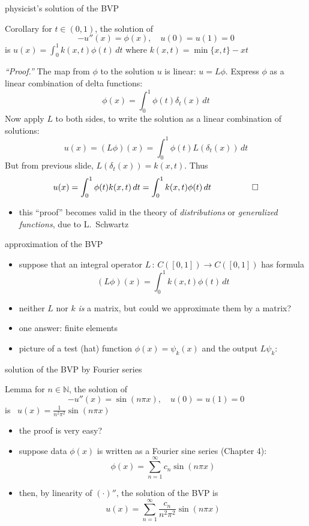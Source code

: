 \documentclass[10pt,
               svgnames,
               hyperref={colorlinks,
                         citecolor=DeepPink4,
                         linkcolor=FireBrick,
                         urlcolor=Maroon},
               usepdftitle=false]{beamer}
\newcommand{\NN}{\mathbb{N}}
\newcommand{\ds}{\displaystyle}
\begin{document}
\begin{frame}{physicist's solution of the BVP}

\begin{block}{Corollary}
for $t\in (0,1)$, the solution of
    $$-u''(x) = \phi(x), \quad u(0) = u(1) = 0$$
is $u(x) = \int_0^1 k(x,t) \phi(t)\,dt$ where $k(x,t) = \min\{x,t\} - xt$
\end{block}

{\footnotesize
\noindent \emph{``Proof.''}  The map from $\phi$ to the solution $u$ is linear: $u=L\phi$. Express $\phi$ as a linear combination of delta functions:
    $$\phi(x) = \int_0^1 \phi(t) \delta_t(x)\,dt$$
Now apply $L$ to both sides, to write the solution as a linear combination of solutions:
	$$u(x) = (L\phi)(x) = \int_0^1 \phi(t) L(\delta_t(x))\,dt$$
But from previous slide, $L(\delta_t(x))=k(x,t)$.  Thus
	$$u(x) = \int_0^1 \phi(t) k(x,t)\,dt = \int_0^1 k(x,t) \phi(t)\,dt \hspace{10mm} \qed$$

\begin{itemize}
\item this ``proof'' becomes valid in the theory of \emph{distributions} or \emph{generalized functions}, due to L.~Schwartz
\end{itemize}
}
\end{frame}


\begin{frame}{approximation of the BVP}

\begin{itemize}
\item suppose that an integral operator $L \,:\, C([0,1]) \to C([0,1])$ has formula
    $$(L\phi)(x) = \int_0^1 k(x,t) \phi(t)\,dt$$
\item neither $L$ nor $k$ \emph{is} a matrix, but could we approximate them by a matrix?
\item one answer: finite elements
\item picture of a test (hat) function $\phi(x)=\psi_k(x)$ and the output $L\psi_k$:

\vspace{40mm}
\end{itemize}
\end{frame}


\begin{frame}{solution of the BVP by Fourier series}

\begin{block}{Lemma}
for $n \in \NN$, the solution of
    $$-u''(x) = \sin(n\pi x), \quad u(0) = u(1) = 0$$
is \, $\ds u(x) = \frac{1}{n^2 \pi^2} \sin(n\pi x)$
\end{block}

\begin{itemize}
\item the proof is very easy?
\item suppose data $\phi(x)$ is written as a Fourier sine series (Chapter 4):
    $$\phi(x) = \sum_{n=1}^\infty c_n \sin(n\pi x)$$
\item then, by linearity of $(\cdot)''$, the solution of the BVP is
	$$u(x) = \sum_{n=1}^\infty \frac{c_n}{n^2 \pi^2} \sin(n\pi x)$$
\end{itemize}
\end{frame}
\end{document}
